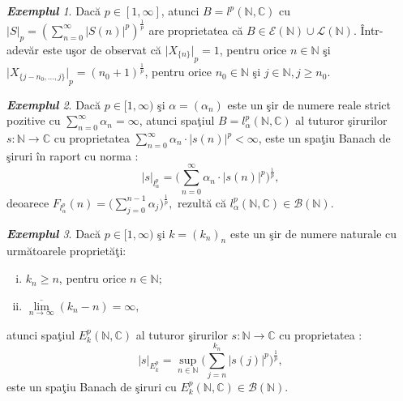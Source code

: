 \documentclass[ a4paper, 12pt]{report}
\theoremstyle{definition}
\theoremstyle{remark}
\newtheorem{exemple}{\bf Exemplul}[section]
\numberwithin{equation}{section}
\begin{document}
\begin{exemple}
Dac\u a $p \in [1,\infty]$, atunci $B=l^p(\mathbb{N},\mathbb{C})$ cu \\
${\lvert S \rvert}_p=(\sum\limits_{n=0}^{\infty}{{\lvert S(n) \rvert}^p})^\frac{1}{p}$ are proprietatea c\u a $B \in \mathcal{E}(\mathbb{N}) \cup \mathcal{L}(\mathbb{N})$. \^Intr-adev\u ar este u\c sor de observat c\u a ${\lvert X_{\{n\}} \rvert}_p=1$, pentru orice $n \in \mathbb{N}$ \c si ${\lvert X_{\{j-n_0,...,j\}} \rvert}_p={(n_0+1)}^\frac{1}{p}$, pentru orice $n_0 \in \mathbb{N}$ \c si $j \in \mathbb{N},j \geq n_0.$
\end{exemple}
\begin{exemple}
Dac\u a $p \in [1,\infty)$ \c si $\alpha = (\alpha_{n})$ este un \c sir de numere reale strict pozitive cu $\sum\limits_{n=0}^{\infty} \alpha_n = \infty$, atunci spa\c tiul $B = l_\alpha^p(\mathbb{N},\mathbb{C})$ al tuturor \c sirurilor $s : \mathbb{N} \rightarrow \mathbb{C}$ cu proprietatea  $\sum\limits_{n=0}^{\infty} \alpha_n \cdot \lvert s(n) \rvert^p < \infty$, este un spa\c tiu Banach de \c siruri \^in raport cu norma :
\[ \lvert s \rvert_{l_{\alpha}^{p}} = \Big(\sum\limits_{n=0}^{\infty} \alpha_n \cdot \lvert s(n) \rvert^p\Big)^{\frac{1}{p}},\]deoarece $F_{l_{\alpha}^{p}}(n) = \Big(\sum\limits_{j=0}^{n-1} \alpha_j\Big)^{\frac{1}{p}} ,$
rezult\u a c\u a $l_{\alpha}^{p}(\mathbb{N},\mathbb{C}) \in \mathcal{B}(\mathbb{N}).$
\end{exemple}
\begin{exemple}
Dac\u a $p\in [1,\infty)$ \c si $k = (k_n)_n$ este un \c sir de numere naturale cu urm\u atoarele propriet\u a\c ti:
\begin{enumerate}[(i)]
\item $k_n \geq n$, pentru orice $n \in \mathbb{N};$
\item $\overline{\lim\limits_{n \rightarrow \infty}}(k_n - n) = \infty,$
\end{enumerate} atunci spa\c tiul $E_{k}^{p}(\mathbb{N},\mathbb{C})$ al tuturor \c sirurilor $s : \mathbb{N} \rightarrow \mathbb{C}$ cu proprietatea :
\[ \lvert s \rvert_{E_{k}^{p}} = \sup\limits_{n \in \mathbb{N}}\Big(\sum\limits_{j=n}^{k_n}\lvert s(j) \rvert^{p}\Big)^{\frac{1}{p}},\] este un spa\c tiu Banach de \c siruri cu $E_{k}^{p}(\mathbb{N},\mathbb{C}) \in \mathcal{B}(\mathbb{N}).$
\end{exemple}
\end{document}
